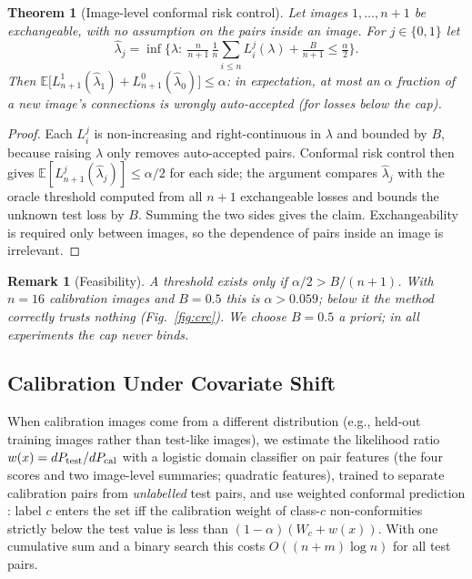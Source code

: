 \documentclass[10pt,letterpaper,journal]{IEEEtran}
\newtheorem{theorem}{Theorem}
\newtheorem{remark}{Remark}
\newcommand{\E}{\mathbb{E}}
\newcommand{\1}{\mathbf{1}}
\begin{document}
\begin{theorem}[Image-level conformal risk control]\label{th:crc}
Let images $1,\dots,n+1$ be exchangeable, with no assumption on the pairs inside an image. For $j\in\{0,1\}$ let
\[\hat\lambda_j=\inf\Big\{\lambda:\ \tfrac{n}{n+1}\,\tfrac1n\textstyle\sum_{i\le n}L_i^{j}(\lambda)+\tfrac{B}{n+1}\le\tfrac\alpha2\Big\}.\]
Then $\E\big[L^1_{n+1}(\hat\lambda_1)+L^0_{n+1}(\hat\lambda_0)\big]\le\alpha$: in expectation, at most an $\alpha$ fraction of a new image's connections is wrongly auto-accepted (for losses below the cap).
\end{theorem}
\begin{proof}
Each $L_i^j$ is non-increasing and right-continuous in $\lambda$ and bounded by $B$, because raising $\lambda$ only removes auto-accepted pairs. Conformal risk control \cite{crc} then gives $\E[L^j_{n+1}(\hat\lambda_j)]\le\alpha/2$ for each side; the argument compares $\hat\lambda_j$ with the oracle threshold computed from all $n+1$ exchangeable losses and bounds the unknown test loss by $B$. Summing the two sides gives the claim. Exchangeability is required only between images, so the dependence of pairs inside an image is irrelevant.
\end{proof}
\begin{remark}[Feasibility]
A threshold exists only if $\alpha/2>B/(n+1)$. With $n=16$ calibration images and $B=0.5$ this is $\alpha>0.059$; below it the method correctly trusts nothing (Fig.~\ref{fig:crc}). We choose $B=0.5$ a priori; in all experiments the cap never binds.
\end{remark}

\subsection{Calibration Under Covariate Shift}
When calibration images come from a different distribution (e.g., held-out training images rather than test-like images), we estimate the likelihood ratio $w(x)=dP_{\rm test}/dP_{\rm cal}$ with a logistic domain classifier on pair features (the four scores and two image-level summaries; quadratic features), trained to separate calibration pairs from \emph{unlabelled} test pairs, and use weighted conformal prediction \cite{tibshirani2019}: label $c$ enters the set iff the calibration weight of class-$c$ non-conformities strictly below the test value is less than $(1-\alpha)(W_c+w(x))$. With one cumulative sum and a binary search this costs $O((n+m)\log n)$ for all test pairs.
\end{document}
